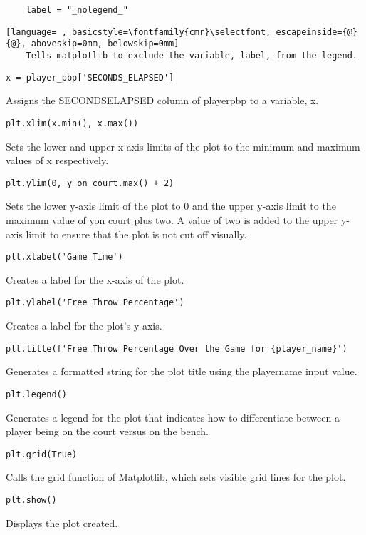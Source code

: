 \documentclass{article}
\begin{document}
\begin{lstlisting}
    label = "_nolegend_"
\end{lstlisting}
\begin{lstlisting}[language= , basicstyle=\fontfamily{cmr}\selectfont, escapeinside={@}{@}, aboveskip=0mm, belowskip=0mm]
    Tells matplotlib to exclude the variable, label, from the legend.
\end{lstlisting}
\begin{lstlisting}
x = player_pbp['SECONDS_ELAPSED']
\end{lstlisting}
Assigns the SECONDS\textunderscore ELAPSED column of player\textunderscore pbp to a variable, x.
\begin{lstlisting}
plt.xlim(x.min(), x.max())
\end{lstlisting}
Sets the lower and upper x-axis limits of the plot to the minimum and maximum values of x respectively.
\begin{lstlisting}
plt.ylim(0, y_on_court.max() + 2)
\end{lstlisting}
Sets the lower y-axis limit of the plot to 0 and the upper y-axis limit to the maximum value of y\textunderscore on \textunderscore court plus two. A value of two is added to the upper y-axis limit to ensure that the plot is not cut off visually.
\begin{lstlisting}
plt.xlabel('Game Time')
\end{lstlisting}
Creates a label for the x-axis of the plot.
\begin{lstlisting}
plt.ylabel('Free Throw Percentage')
\end{lstlisting}
Creates a label for the plot's y-axis.
\begin{lstlisting}
plt.title(f'Free Throw Percentage Over the Game for {player_name}')
\end{lstlisting}
Generates a formatted string for the plot title using the  player\textunderscore name input value.
\begin{lstlisting}
plt.legend()
\end{lstlisting}
Generates a legend for the plot that indicates how to differentiate between a player being on the court versus on the bench.
\begin{lstlisting}
plt.grid(True)
\end{lstlisting}
Calls the grid function of Matplotlib, which sets visible grid lines for the plot.
\begin{lstlisting}
plt.show()
\end{lstlisting}
Displays the plot created.
\end{document}
